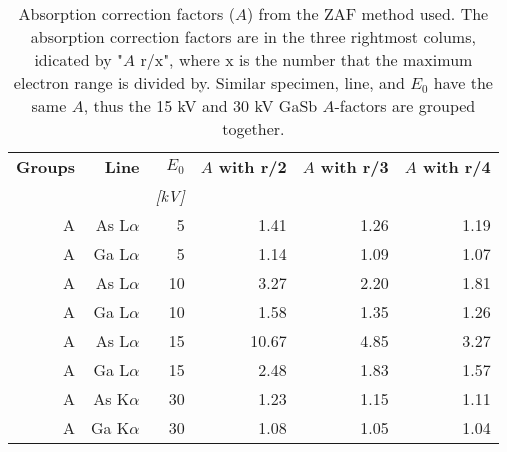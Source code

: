 \begin{table}[phtb]
    \begin{center}
        \caption{
            Absorption correction factors ($A$) from the ZAF method used.
            The absorption correction factors are in the three rightmost colums, idicated by "$A$ r/x", where x is the number that the maximum electron range is divided by.
            Similar specimen, line, and $E_0$ have the same $A$, thus  the 15 kV and 30 kV GaSb $A$-factors are grouped together.
        }
        \label{tab:results:ZAF_corrections_factors}
        \begin{tabular}{rrrrrr}
            \hline
            \textbf{Groups} & \textbf{Line} & \textbf{$E_0$} & \textbf{$A$ with r/2} & \textbf{$A$ with r/3} & \textbf{$A$ with r/4} \\
            \emph{}         & \emph{}       & \emph{[kV]}    & \emph{}               & \emph{}               & \emph{}               \\
            \hline
            A               & As L$\alpha$  & 5              & 1.41                  & 1.26                  & 1.19                  \\
            A               & Ga L$\alpha$  & 5              & 1.14                  & 1.09                  & 1.07                  \\
            A               & As L$\alpha$  & 10             & 3.27                  & 2.20                  & 1.81                  \\
            A               & Ga L$\alpha$  & 10             & 1.58                  & 1.35                  & 1.26                  \\
            A               & As L$\alpha$  & 15             & 10.67                 & 4.85                  & 3.27                  \\
            A               & Ga L$\alpha$  & 15             & 2.48                  & 1.83                  & 1.57                  \\
            A               & As K$\alpha$  & 30             & 1.23                  & 1.15                  & 1.11                  \\
            A               & Ga K$\alpha$  & 30             & 1.08                  & 1.05                  & 1.04                  \\

\end{tabular}
\end{center}
\end{table}
